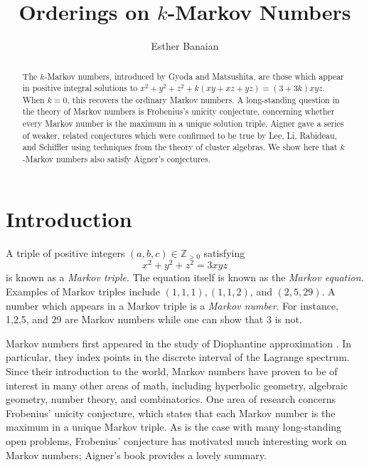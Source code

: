 \documentclass[12pt, letterpaper,table]{amsart}
\theoremstyle{remark}
\begin{document}
\title[Orderings on $k$-Markov Numbers]{Orderings on $k$-Markov Numbers}
\author{Esther Banaian}
\address{Institut f{\"u}r Matematik \\Universit{\"a}t Paderborn\\Paderborn, Germany}
\date{}





\begin{abstract}
The $k$-Markov numbers, introduced by Gyoda and Matsushita, are those which appear in positive integral solutions to $x^2 + y^2 + z^2 + k(xy + xz + yz) = (3+3k)xyz$. When $k =0$, this recovers the ordinary Markov numbers. A long-standing question in the theory of Markov numbers is Frobenius's unicity conjecture, concerning whether every Markov number is the maximum in a unique solution triple. Aigner gave a series of weaker, related conjectures which were confirmed to be true by Lee, Li, Rabideau, and Schiffler using techniques from the theory of cluster algebras. We show here that $k$-Markov numbers also satisfy Aigner's conjectures. 
\end{abstract}


\maketitle



\section{Introduction}

A triple of positive integers $(a,b,c) \in \mathbb{Z}_{>0}$ satisfying \[
x^2 + y^2 + z^2 = 3xyz
\]
is known as a \emph{Markov triple}. The equation itself is known as the \emph{Markov equation}. Examples of Markov triples include $(1,1,1), (1,1,2)$, and $(2,5,29)$. A number which appears in a Markov triple is a \emph{Markov number}. For instance, 1,2,5, and 29 are Markov numbers while one can show that 3 is not.

Markov numbers first appeared in the study of Diophantine approximation \cite{markoff1879formes}. In particular, they index points in the discrete interval of the Lagrange spectrum. Since their introduction to the world, Markov numbers have proven to be of interest in many other areas of math, including hyperbolic geometry, algebraic geometry, number theory, and combinatorics. One area of research concerns Frobenius' unicity conjecture, which states that each Markov number is the maximum in a unique Markov triple. As is the case with many long-standing open problems, Frobenius' conjecture has motivated much interesting work on Markov numbers; Aigner's book \cite{aigner2013Markov} provides a lovely summary.
\end{document}

